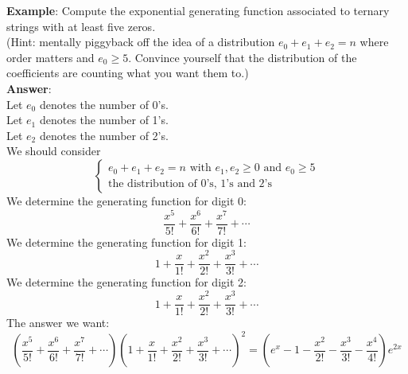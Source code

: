 \noindent \textbf{Example}: Compute the exponential generating function associated to ternary strings with at least five zeros.\\
(Hint: mentally piggyback off the idea of a distribution $e_0+e_1+e_2=n$ where order matters and $e_0 \geq 5$. Convince yourself that the distribution of the coefficients are counting what you want them to.)\\
\textbf{Answer}:\\
Let $e_0$ denotes the number of 0's.\\
Let $e_1$ denotes the number of 1's.\\
Let $e_2$ denotes the number of 2's.\\
We should consider
\begin{equation}
    \begin{cases}
        e_0+e_1+e_2=n \text{ with } e_1,e_2 \geq 0 \text{ and }e_0 \geq 5\\
        \text{the distribution of 0's, 1's and 2's}
    \end{cases}
\end{equation}
We determine the generating function for digit 0:
$$\frac{x^5}{5!}+\frac{x^6}{6!}+\frac{x^7}{7!}+ \cdots$$
We determine the generating function for digit 1:
$$1+\frac{x}{1!}+\frac{x^2}{2!}+\frac{x^3}{3!}+ \cdots$$
We determine the generating function for digit 2:
$$1+\frac{x}{1!}+\frac{x^2}{2!}+\frac{x^3}{3!}+ \cdots$$
The answer we want:
$$(\frac{x^5}{5!}+\frac{x^6}{6!}+\frac{x^7}{7!}+ \cdots)(1+\frac{x}{1!}+\frac{x^2}{2!}+\frac{x^3}{3!}+ \cdots)^2=(e^x-1-\frac{x^2}{2!}-\frac{x^3}{3!}-\frac{x^4}{4!})e^{2x}$$


